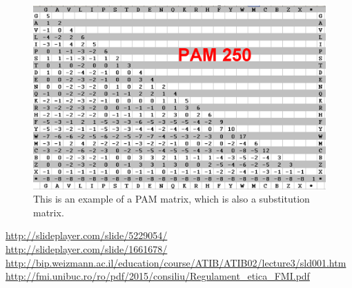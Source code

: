 \documentclass{article}
\begin{document}
\newpage
\paragraph{}
\begin{figure}[h!]
  \includegraphics[width=\linewidth]{pam250.png}
 	This is an example of a PAM matrix, which is also a substitution matrix.
  \label{fig:boat1}
\end{figure}

\newpage
{\small
\begin{thebibliography}{9999}

\url {http://slideplayer.com/slide/5229054/}\\

\url {http://slideplayer.com/slide/1661678/}\\

\url {http://bip.weizmann.ac.il/education/course/ATIB/ATIB02/lecture3/sld001.htm}\\

\url {http://fmi.unibuc.ro/ro/pdf/2015/consiliu/Regulament_etica_FMI.pdf}\\


\end{thebibliography}
}
\end{document}
